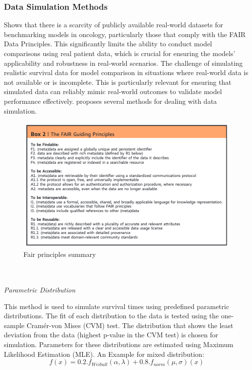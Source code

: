 \subsubsection{Data Simulation Methods}
\noindent \parencite{thurow_how_2023} Shows that there is a scarcity of publicly available real-world datasets for benchmarking models in oncology, particularly those that comply with the FAIR Data Principles. This significantly limits the ability to conduct model comparisons using real patient data, which is crucial for ensuring the models' applicability and robustness in real-world scenarios. The challenge of simulating realistic survival data for model comparison in situations where real-world data is not available or is incomplete. This is particularly relevant for ensuring that simulated data can reliably mimic real-world outcomes to validate model performance effectively. \parencite{thurow_how_2023} proposes several methods for dealing with data simulation.
\begin{figure}
	\includegraphics[scale=0.85]{Figures/FAIR_PRINCIPLES.png}
	\caption{\parencite{wilkinson_fair_2016} Fair principles summary}
\end{figure}
\\\\
\textit{Parametric Distribution}
\par \noindent This method is used to simulate survival times using predefined parametric distributions. The fit of each distribution to the data is tested using the one-sample Cramér-von Mises (CVM) test. The distribution that shows the least deviation from the data (highest p-value in the CVM test) is chosen for simulation. Parameters for these distributions are estimated using Maximum Likelihood Estimation (MLE). An Example for mixed distribution: 
\begin{equation} \label{eq:paramdist}f(x)=0.2.f_{Weibull}(\alpha,\lambda)+0.8.f_{norm}(\mu,\sigma)(x)\end{equation}

